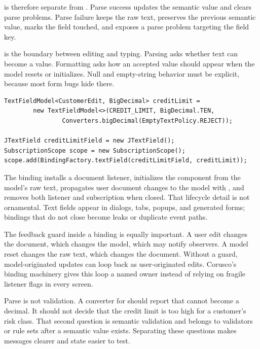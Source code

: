  is therefore separate from . Parse success updates the semantic value and clears parse problems. Parse failure keeps the raw text, preserves the previous semantic value, marks the field touched, and exposes a parse problem targeting the field key.

 is the boundary between editing and typing. Parsing asks whether text can become a value. Formatting asks how an accepted value should appear when the model resets or initializes. Null and empty-string behavior must be explicit, because most form bugs hide there.

\begin{lstlisting}[caption={A Corusco text field model bound to a Swing field.}]
TextFieldModel<CustomerEdit, BigDecimal> creditLimit =
        new TextFieldModel<>(CREDIT_LIMIT, BigDecimal.TEN,
                Converters.bigDecimal(EmptyTextPolicy.REJECT));

JTextField creditLimitField = new JTextField();
SubscriptionScope scope = new SubscriptionScope();
scope.add(BindingFactory.textField(creditLimitField, creditLimit));
\end{lstlisting}

The binding installs a document listener, initializes the component from the model's raw text, propagates user document changes to the model with , and removes both listener and subscription when closed. That lifecycle detail is not ornamental. Text fields appear in dialogs, tabs, popups, and generated forms; bindings that do not close become leaks or duplicate event paths.

The feedback guard inside a binding is equally important. A user edit changes the document, which changes the model, which may notify observers. A model reset changes the raw text, which changes the document. Without a guard, model-originated updates can loop back as user-originated edits. Corusco's binding machinery gives this loop a named owner instead of relying on fragile listener flags in every screen.

Parse is not validation. A converter for  should report that  cannot become a decimal. It should not decide that the credit limit is too high for a customer's risk class. That second question is semantic validation and belongs to validators or rule sets after a semantic value exists. Separating these questions makes messages clearer and state easier to test.

